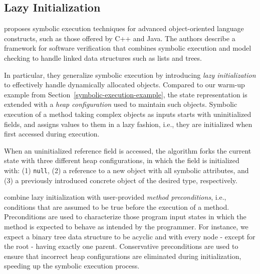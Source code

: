 %

\subsection{Lazy Initialization}
\label{ss:complex-objects}

\cite{KPV-TACAS03} proposes symbolic execution techniques for advanced object-oriented language constructs, such as those offered by C++ and Java. The authors describe a framework for software verification that combines symbolic execution and model checking to handle linked data structures such as lists and trees. %

In particular, they generalize symbolic execution by introducing {\em lazy initialization} to effectively handle dynamically allocated objects. Compared to our warm-up example from Section~\ref{symbolic-execution-example}, the state representation is extended with a {\em heap configuration} used to maintain such objects. Symbolic execution of a method taking complex objects as inputs starts with uninitialized fields, and assigns values to them in a lazy fashion, i.e., they are initialized when first accessed during execution.

When an uninitialized reference field is accessed, the algorithm forks the current state with three different heap configurations, in which the field is initialized with: (1) {\tt null}, (2) a reference to a new object with all symbolic attributes, and (3) a previously introduced concrete object of the desired type, respectively. 

\cite{KPV-TACAS03,SPF-ISSTA04} combine lazy initialization with user-provided {\em method preconditions}, i.e., conditions that are assumed to be true before the execution of a method. Preconditions are used to characterize those program input states in which the method is expected to behave as intended by the programmer. For instance, we expect a binary tree data structure to be acyclic and with every node - except for the root - having exactly one parent. Conservative preconditions are used to ensure that incorrect heap configurations are eliminated during initialization, speeding up the symbolic execution process. %

